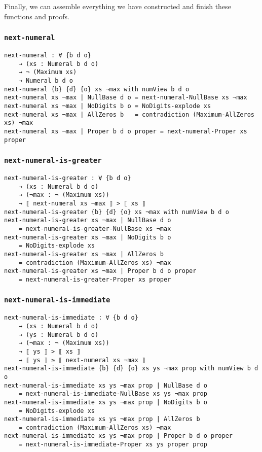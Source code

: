 \documentclass[\main/thesis.tex]{subfiles}
\begin{document}
Finally, we can assemble everything we have constructed and
finish these functions and proofs.

\subsubsection{{\lstinline|next-numeral|}}
\begin{lstlisting}[basicstyle=\ttfamily\scriptsize]
next-numeral : ∀ {b d o}
    → (xs : Numeral b d o)
    → ¬ (Maximum xs)
    → Numeral b d o
next-numeral {b} {d} {o} xs ¬max with numView b d o
next-numeral xs ¬max | NullBase d o = next-numeral-NullBase xs ¬max
next-numeral xs ¬max | NoDigits b o = NoDigits-explode xs
next-numeral xs ¬max | AllZeros b   = contradiction (Maximum-AllZeros xs) ¬max
next-numeral xs ¬max | Proper b d o proper = next-numeral-Proper xs proper

\end{lstlisting}

\subsubsection{{\lstinline|next-numeral-is-greater|}}
\begin{lstlisting}[basicstyle=\ttfamily\scriptsize]
next-numeral-is-greater : ∀ {b d o}
    → (xs : Numeral b d o)
    → (¬max : ¬ (Maximum xs))
    → ⟦ next-numeral xs ¬max ⟧ > ⟦ xs ⟧
next-numeral-is-greater {b} {d} {o} xs ¬max with numView b d o
next-numeral-is-greater xs ¬max | NullBase d o
    = next-numeral-is-greater-NullBase xs ¬max
next-numeral-is-greater xs ¬max | NoDigits b o
    = NoDigits-explode xs
next-numeral-is-greater xs ¬max | AllZeros b
    = contradiction (Maximum-AllZeros xs) ¬max
next-numeral-is-greater xs ¬max | Proper b d o proper
    = next-numeral-is-greater-Proper xs proper
\end{lstlisting}

\subsubsection{{\lstinline|next-numeral-is-immediate|}}
\begin{lstlisting}[basicstyle=\ttfamily\scriptsize]
next-numeral-is-immediate : ∀ {b d o}
    → (xs : Numeral b d o)
    → (ys : Numeral b d o)
    → (¬max : ¬ (Maximum xs))
    → ⟦ ys ⟧ > ⟦ xs ⟧
    → ⟦ ys ⟧ ≥ ⟦ next-numeral xs ¬max ⟧
next-numeral-is-immediate {b} {d} {o} xs ys ¬max prop with numView b d o
next-numeral-is-immediate xs ys ¬max prop | NullBase d o
    = next-numeral-is-immediate-NullBase xs ys ¬max prop
next-numeral-is-immediate xs ys ¬max prop | NoDigits b o
    = NoDigits-explode xs
next-numeral-is-immediate xs ys ¬max prop | AllZeros b
    = contradiction (Maximum-AllZeros xs) ¬max
next-numeral-is-immediate xs ys ¬max prop | Proper b d o proper
    = next-numeral-is-immediate-Proper xs ys proper prop
\end{lstlisting}
\end{document}
